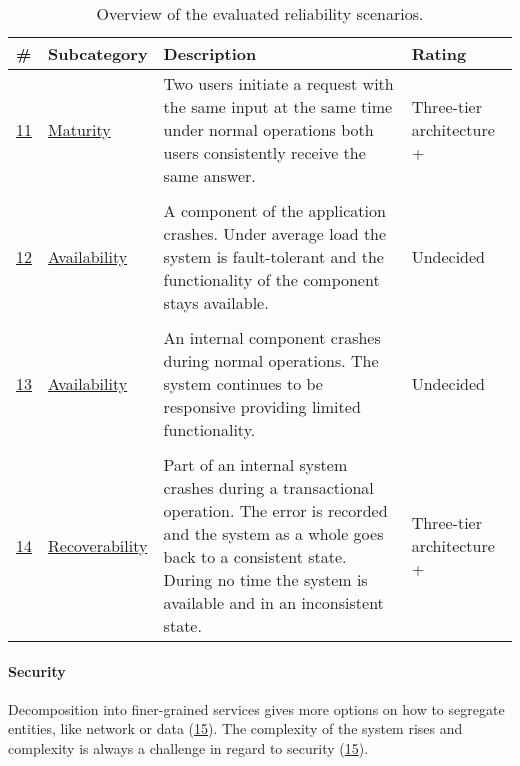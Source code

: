 \begin{table}[H]
  \renewcommand{\arraystretch}{1.2}
  \centering
  \sffamily
  \begin{footnotesize}
    \begin{tabular}{l l p{} p{}}
    \toprule
    \textbf{\#} & \textbf{Subcategory} & \textbf{Description}& \textbf{Rating} \\
    \midrule
    \hyperref[quaMicro:s11]{11} & \hyperref[quaMicro:s11]{Maturity} & Two users initiate a request with the same input at
the same time under normal operations both users consistently receive the same answer.
 & Three-tier architecture + \\  \\
	\hyperref[quaMicro:s12]{12} & \hyperref[quaMicro:s12]{Availability} & A component of the application crashes. Under average load the system is fault-tolerant and the functionality of the component stays available. & Undecided \\ \\
		\hyperref[quaMicro:s13]{13} & \hyperref[quaMicro:s13]{Availability} & An internal component crashes during normal operations. The system continues to be responsive providing limited functionality. & Undecided \\ \\
		\hyperref[quaMicro:s14]{14} & \hyperref[quaMicro:s13]{Recoverability} & Part of an internal system crashes during a transactional operation. The error is recorded and the system as a whole goes back to a consistent state. During no time the system is available and in an inconsistent state. & Three-tier architecture + \\
   \bottomrule
    \end{tabular}
  \end{footnotesize}
  \rmfamily
  \caption[Overview of the evaluated reliability scenarios.]{Overview of the evaluated reliability scenarios.}
  \label{quaMicro:tableOverview}
\end{table}

\paragraph{Security}
\begin{itemize}
\pro Decomposition into finer-grained services gives more options on how to segregate entities, like network or data (\hyperref[quaMicro:s15]{15}).
\con The complexity of the system rises and complexity is always a challenge in regard to security (\hyperref[quaMicro:s15]{15}).
\end{itemize}

